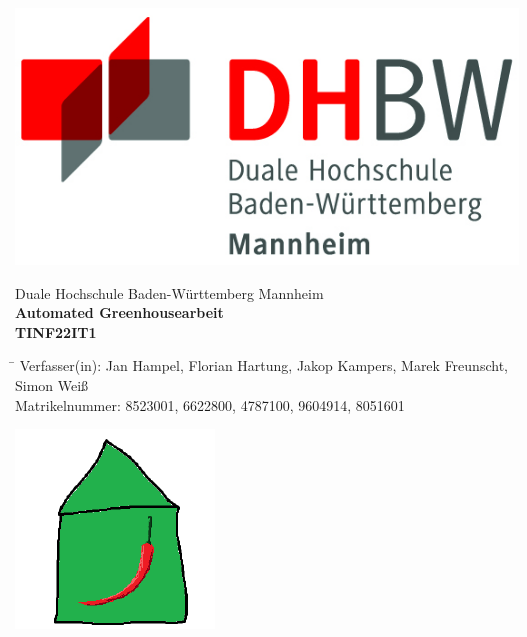 \begin{titlepage}
    \begin{minipage}{\textwidth}
            \vspace{-2cm}
            \noindent \includegraphics[scale=0.5]{images/logo.jpg}
    \end{minipage}
    \vspace{1em}
    \begin{center}
        {\textsf{\large Duale Hochschule Baden-W\"urttemberg Mannheim}}\\[4em]
        {\textsf{\textbf{\large{Automated Greenhouse}arbeit}}}\\[6mm]
        {\textsf{\textbf{\large{}TINF22IT1}}}\\[4em]
        
        \begin{minipage}{\textwidth}
            \begin{tabbing}
             \hspace{0.85cm}\=\kill
            Verfasser(in):  Jan Hampel, Florian Hartung, Jakop Kampers, Marek Freunscht, Simon Weiß\\[1.5mm]
            Matrikelnummer:  8523001, 6622800, 4787100, 9604914, 8051601\\[4em]
            \end{tabbing}
            \noindent 
            \begin{center}
                \includegraphics[scale=0.5]{images/GH_logo.png}
            \end{center}
        
        \end{minipage}
    \end{center}
    \end{titlepage}